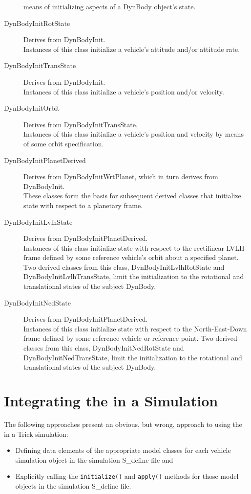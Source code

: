 \begin{description}
means of initializing aspects of a DynBody object's state.
\item[DynBodyInitRotState] Derives from DynBodyInit. \\
Instances of this class initialize a vehicle's attitude
and/or attitude rate.
\item[DynBodyInitTransState] Derives from DynBodyInit. \\
Instances of this class initialize a vehicle's position
and/or velocity.
\item[DynBodyInitOrbit] Derives from DynBodyInitTransState. \\
Instances of this class initialize a vehicle's position
and velocity by means of some orbit specification.
\item[DynBodyInitPlanetDerived] Derives from DynBodyInitWrtPlanet,
which in turn derives from DynBodyInit. \\
These classes form the basis for subsequent derived classes that
initialize state with respect to a planetary frame.
\item[DynBodyInitLvlhState] Derives from DynBodyInitPlanetDerived. \\
Instances of this class initialize state with respect to the
rectilinear LVLH frame defined by some reference vehicle's orbit
about a specified planet.
Two derived classes from this class,
DynBodyInitLvlhRotState and DynBodyInitLvlhTransState,
limit the initialization to the rotational and translational
states of the subject DynBody.
\item[DynBodyInitNedState] Derives from DynBodyInitPlanetDerived. \\
Instances of this class initialize state with respect to the
North-East-Down frame defined by some reference vehicle or
reference point.
Two derived classes from this class,
DynBodyInitNedRotState and DynBodyInitNedTransState,
limit the initialization to the rotational and translational
states of the subject DynBody.
\end{description}

\section*{Integrating the \ModelDesc in a Simulation}

The following approaches present an obvious, but wrong, approach to using the \ModelDesc
in a Trick simulation:
\begin{itemize}
\item Defining data elements of the appropriate model classes
for each vehicle simulation object in the simulation S\_define file and
\item Explicitly calling the {\tt initialize()} and {\tt apply()} methods
for those model objects in the simulation S\_define file.
\end{itemize}

